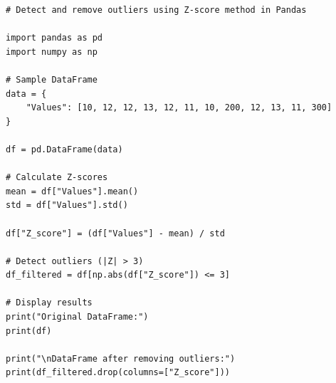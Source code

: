 \begin{verbatim}
# Detect and remove outliers using Z-score method in Pandas

import pandas as pd
import numpy as np

# Sample DataFrame
data = {
    "Values": [10, 12, 12, 13, 12, 11, 10, 200, 12, 13, 11, 300]
}

df = pd.DataFrame(data)

# Calculate Z-scores
mean = df["Values"].mean()
std = df["Values"].std()

df["Z_score"] = (df["Values"] - mean) / std

# Detect outliers (|Z| > 3)
df_filtered = df[np.abs(df["Z_score"]) <= 3]

# Display results
print("Original DataFrame:")
print(df)

print("\nDataFrame after removing outliers:")
print(df_filtered.drop(columns=["Z_score"]))
\end{verbatim}